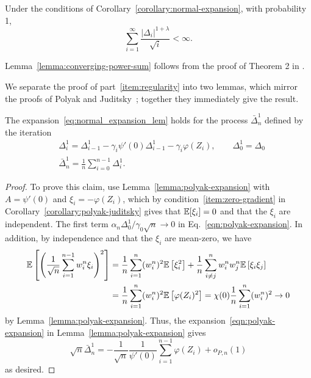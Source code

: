 \begin{lem}
  \label{lemma:converging-power-sum}
  Under the conditions of Corollary~\ref{corollary:normal-expansion},
  with probability 1,
  \begin{equation*}
  \sum_{i=1}^\infty \frac{|\Delta_{i}|^{1+\lambda}}{\sqrt{i}} < \infty.
  \end{equation*}
\end{lem}
\noindent
Lemma~\ref{lemma:converging-power-sum} follows from the proof of Theorem 2
in \cite[page 851]{polyak1992acceleration}.

We separate the proof of part~\eqref{item:regularity} into two lemmas, which
mirror the proofs of Polyak and Juditsky~\cite{PolyakJu92}; together they
immediately give the result.

\begin{lemma}
  The expansion~\eqref{eq:normal_expansion_lem} holds for the process
  $\bar{\Delta}^1_n$ defined by the iteration
  \begin{align}
    \label{eqn:polyak-expansion_lem1_alg}
    & \Delta_i^1  = \Delta_{i-1}^1 - \gamma_i \psi'(0) \Delta_{i-1}^1 - \gamma_i \varphi(Z_i), \qquad
    \Delta_0^1 = \Delta_0\\
    & \bar{\Delta}^1_n = \frac{1}{n}\sum_{i=0}^{n-1} \Delta^1_i.
    \nonumber
  \end{align}
\end{lemma}
\begin{proof}
  To prove this claim, use Lemma~\ref{lemma:polyak-expansion} with $A =
  \psi'(0)$ and $\xi_i = -\varphi(Z_i)$, which by
  condition~\eqref{item:zero-gradient} in
  Corollary~\ref{corollary:polyak-juditsky} gives that
  $\mathbb{E}[\xi_i] = 0$ and that the $\xi_i$ are independent.
  The first term $\alpha_n \Delta_0^1 / \gamma_0 \sqrt{n} \to 0$
  in Eq.~\eqref{eqn:polyak-expansion}. In addition,
  by independence and that the $\xi_i$ are mean-zero, we have
  \begin{align*}
    \mathbb{E}\left[  \left( \frac{1}{\sqrt{n}} \sum_{i=1}^{n-1} w_i^n \xi_i \right)^2 \right]
    & = \frac{1}{n}  \sum_{i=1}^n (w_i^n)^2 \mathbb{E}\left[  \xi_i^2\right] + \frac{1}{n}  \sum_{i\neq j}^n w_i^n w_j^n \mathbb{E}\left[  \xi_i \xi_j\right] \\
    & = \frac{1}{n}  \sum_{i=1}^n (w_i^n)^2 \mathbb{E}\left[  \varphi(Z_i)^2\right] = \chi(0) \frac{1}{n}  \sum_{i=1}^n (w_i^n)^2 \to 0
  \end{align*}
  by Lemma~\ref{lemma:polyak-expansion}.
  Thus, the expansion~\eqref{eqn:polyak-expansion} in
  Lemma~\ref{lemma:polyak-expansion} gives
  \begin{equation*}
    \sqrt{n} \bar{\Delta}^1_n
    = -\frac{1}{\sqrt{n}} \frac{1}{\psi'(0)}
    \sum_{i=1}^{n-1} \varphi(Z_i)+ o_{P,n}(1)
  \end{equation*}
  as desired.
\end{proof}


